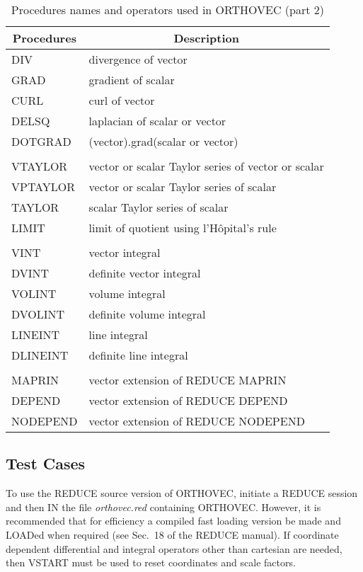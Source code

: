 \begin{table}
\begin{center}
\begin{tabular}{|l l|} \hline 
\multicolumn{1}{|c}{Procedures} & \multicolumn{1}{c|}{Description} \\ \hline 
DIV & divergence of vector \\ 
GRAD & gradient of scalar \\ 
CURL & curl of vector \\ 
DELSQ & laplacian of scalar or vector \\ 
DOTGRAD & (vector).grad(scalar or vector) \\ &  \\ 
VTAYLOR & vector or scalar Taylor series of vector or scalar \\ 
VPTAYLOR & vector or scalar Taylor series of scalar \\ 
TAYLOR & scalar Taylor series of scalar \\
LIMIT & limit of quotient using l'H\^opital's rule \\ &  \\
VINT & vector integral \\ 
DVINT & definite vector integral \\ 
VOLINT & volume integral \\ 
DVOLINT & definite volume integral \\ 
LINEINT & line integral \\ 
DLINEINT & definite line integral \\  & \\
MAPRIN & vector extension of REDUCE MAPRIN \\
DEPEND & vector extension of REDUCE DEPEND \\
NODEPEND & vector extension of REDUCE NODEPEND \\ \hline 
\end{tabular}
\end{center}
\caption{Procedures names and operators used in ORTHOVEC (part 2)}
\end{table}


\subsection{Test Cases}

To use the REDUCE source version of ORTHOVEC, initiate a REDUCE
session and then IN the file {\em orthovec.red} containing ORTHOVEC.
However, it is recommended that for efficiency a compiled fast loading
version be made and LOADed when required (see Sec.~18 of the REDUCE
manual).  If coordinate dependent differential and integral operators
other than cartesian are needed, then VSTART must be used to reset
coordinates and scale factors.

